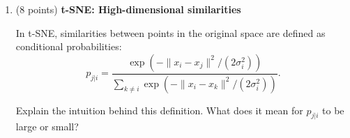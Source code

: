 \begin{enumerate}
\begin{solution}

\end{solution}


\vspace{15pt}


\item (8 points) \textbf{ t-SNE: High-dimensional similarities}

In t-SNE, similarities between points in the original space are defined as conditional
probabilities:
\[
p_{j|i} =
\frac{\exp\left(-\|x_i - x_j\|^2 / (2\sigma_i^2)\right)}
{\sum_{k \neq i} \exp\left(-\|x_i - x_k\|^2 / (2\sigma_i^2)\right)}.
\]

Explain the intuition behind this definition. What does it mean for $p_{j|i}$ to be
large or small?

\begin{solution}

\end{solution}







\end{enumerate}
